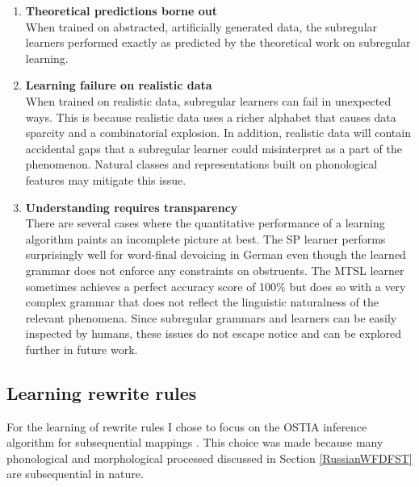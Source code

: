 \begin{enumerate}
    \item \textbf{Theoretical predictions borne out}\\
          When trained on abstracted, artificially generated data, the subregular learners performed exactly as predicted by the theoretical work on subregular learning.
    \item \textbf{Learning failure on realistic data}\\
          When trained on realistic data, subregular learners can fail in unexpected ways.
          This is because realistic data uses a richer alphabet that causes data sparcity and a combinatorial explosion.
          In addition, realistic data will contain accidental gaps that a subregular learner could misinterpret as a part of the phenomenon.
          Natural classes and representations built on phonological features may mitigate this issue.
    \item \textbf{Understanding requires transparency}\\
          There are several cases where the quantitative performance of a learning algorithm paints an incomplete picture at best.
          The SP learner performs surprisingly well for word-final devoicing in German even though the learned grammar does not enforce any constraints on obstruents.
          The MTSL learner sometimes achieves a perfect accuracy score of 100\% but does so with a very complex grammar that does not reflect the linguistic naturalness of the relevant phenomena.
          Since subregular grammars and learners can be easily inspected by humans, these issues do not escape notice and can be explored further in future work.
\end{enumerate}


\subsection{Learning rewrite rules}

For the learning of rewrite rules I chose to focus on the OSTIA inference algorithm for subsequential mappings \citep{OncinaEtAl1993,DeLaHiguera2010}.
This choice was made because many phonological and morphological processed discussed in Section \ref{RussianWFDFST} are subsequential in nature.

